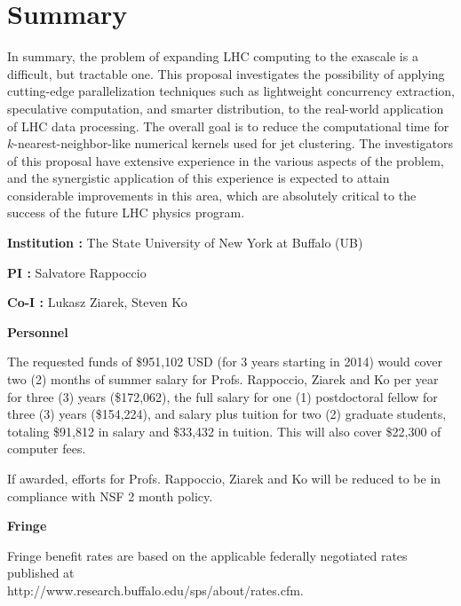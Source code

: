 \documentclass[times,11pt]{article}
\begin{document}
\section{Summary}

In summary, the problem of expanding LHC computing to the exascale is
a difficult, but tractable one. This proposal investigates the
possibility of applying cutting-edge parallelization techniques such
as lightweight concurrency extraction, speculative computation, and
smarter distribution, to the
real-world application of LHC data processing.
The overall goal is to reduce the computational time for
$k$-nearest-neighbor-like numerical kernels used for jet
clustering. The investigators of this
proposal have extensive experience in the various aspects of the
problem, and the synergistic application of this experience is
expected to attain considerable improvements in this area, which
are absolutely critical to the success of the future LHC physics
program. 



\newpage
{}
\renewcommand{\thepage} {A--\arabic{page}}



{}
%

\newpage
{}
\renewcommand{\thepage} {B--\arabic{page}}

\bigskip
{\bf Institution : } The State University of New York at Buffalo (UB)

{\bf PI : } Salvatore Rappoccio

{\bf Co-I : } Lukasz Ziarek, Steven Ko


\bigskip
{\bf Personnel}
\bigskip


The requested funds of \$951,102 USD (for 3 years starting in 2014)
would cover two (2) months of summer salary for Profs. Rappoccio,
Ziarek and Ko per
year for three (3) years
(\$172,062), the full salary for 
one (1) postdoctoral fellow for three (3)
years (\$154,224), and salary plus
tuition for two (2) graduate students, totaling \$91,812 in
salary and \$33,432 in tuition. This will also cover \$22,300 of
computer fees. 

If awarded, efforts for Profs. Rappoccio, Ziarek and Ko will be
reduced to be in compliance with NSF 2 month policy. 

\bigskip
{\bf Fringe}
\bigskip


Fringe benefit rates are based on the applicable federally negotiated rates published at
\\
http://www.research.buffalo.edu/sps/about/rates.cfm.
\end{document}
